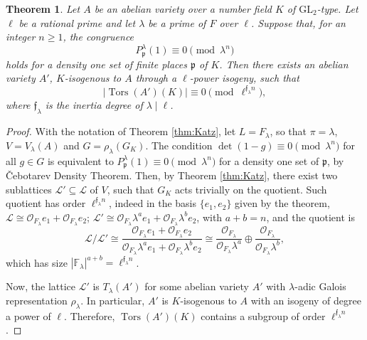 \documentclass[10pt,a4paper]{amsart}
\newtheorem{theorem}{Theorem}
\newcommand{\GL}{\text{GL}}
\DeclareMathOperator{\Tors}{Tors}
\newcommand{\f}{\mathfrak{f}}
\newcommand{\p}{\mathfrak{p}}
\begin{document}
\begin{theorem}\label{thm:main_new}
    Let \(A\) be an abelian variety over a number field \(K\) of \(\GL_2\)-type. Let \(\ell\) be a rational prime and let \(\lambda\) be a prime of \(F\) over \(\ell\). Suppose that, for an integer \(n \ge 1\), the congruence
    \[
    P_\p^\lambda(1) \equiv 0 \pmod {\lambda^n}
    \]
    holds for a density one set of finite places \(\p\) of \(K\). Then there exists an abelian variety \(A'\), \(K\)-isogenous to \(A\) through a \(\ell\)-power isogeny, such that 
    \[
    |\Tors(A')(K)| \equiv 0 \pmod {\ell^{\f_{\lambda}n}},
    \]
    where \(\f_\lambda\) is the inertia degree of \(\lambda \mid \ell\).
\end{theorem}

\begin{proof}
    With the notation of Theorem \ref{thm:Katz}, let \(L=F_\lambda\), so that \(\pi=\lambda\), \(V=V_\lambda (A)\) and \(G=\rho_\lambda(G_K)\). The condition \(\det(1-g)\equiv 0 \pmod {\lambda^n}\) for all \(g \in G\) is equivalent to \(P_\p^{\lambda}(1) \equiv 0 \pmod{\lambda^n}\) for a density one set of \(\p\), by \v Cebotarev Density Theorem. Then, by Theorem \ref{thm:Katz}, there exist two sublattices \(\mathcal{L'} \subseteq \mathcal{L}\) of \(V\), such that \(G_K\) acts trivially on the quotient. Such quotient has order \(\ell^{\f_\lambda n}\), indeed in the basis \(\{e_1,e_2\}\) given by the theorem, \(\mathcal{L} \cong \mathcal{O}_{F_\lambda} e_1 + \mathcal{O}_{F_\lambda} e_2\); \(\mathcal{L}' \cong \mathcal{O}_{F_\lambda} \lambda^a e_1 + \mathcal{O}_{F_\lambda} \lambda^b e_2\), with \(a+b=n\), and the quotient is
    \[
    \mathcal{L}/\mathcal{L}' \cong \dfrac{\mathcal{O}_{F_\lambda} e_1 + \mathcal{O}_{F_\lambda} e_2}{\mathcal{O}_{F_\lambda} \lambda^a e_1 + \mathcal{O}_{F_\lambda} \lambda^b e_2} \cong \dfrac{{\mathcal{O}_{F_\lambda}}}{\mathcal{O}_{F_\lambda} \lambda^a} \oplus \dfrac{\mathcal{O}_{F_\lambda}}{\mathcal{O}_{F_\lambda} \lambda^b},
    \]
    which has size \(|\mathbb{F}_\lambda|^{a+b} = \ell^{\f_\lambda n}\).

    Now, the lattice \(\mathcal{L}'\) is \(T_\lambda (A')\) for some abelian variety \(A'\) with \(\lambda\)-adic Galois representation \(\rho_\lambda\). In particular, \(A'\) is \(K\)-isogenous to \(A\) with an isogeny of degree a power of \(\ell\). Therefore, \(\Tors (A')(K)\) contains a subgroup of order \(\ell^{\f_\lambda n}\).
\end{proof}
\end{document}
